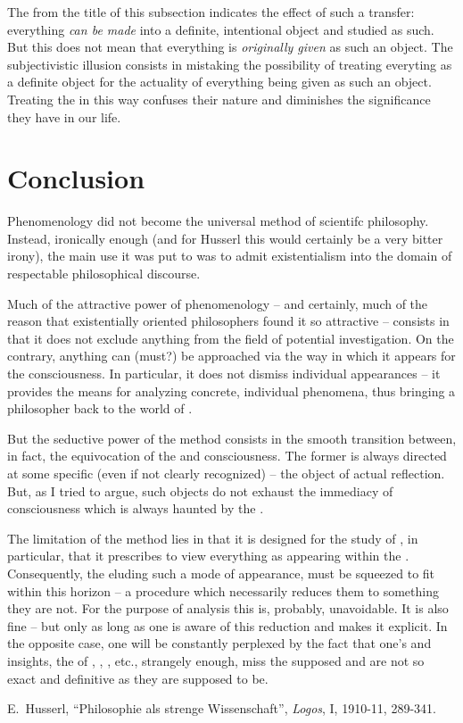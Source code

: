 The  from the title of this subsection 
indicates the effect of such a transfer: 
everything {\em can be made} into a definite, intentional object and 
studied as such. But this 
does not mean that everything is {\em originally given} as such an object.
The subjectivistic illusion consists in mistaking the possibility of 
treating everyting as a definite object for the actuality of everything being 
given as such an object.
Treating the  in this way confuses their nature 
and diminishes the significance they have in our life.

\section{Conclusion}
Phenomenology did not become the universal method of 
scientifc philosophy. Instead, ironically enough (and for Husserl this 
would certainly be a very bitter irony), the main use it was put to was to 
admit existentialism into the domain of respectable philosophical 
discourse. 

Much of the attractive power of phenomenology -- and certainly, much 
of the reason that existentially oriented philosophers found it so 
attractive -- consists in that it 
does not exclude anything from the field of potential investigation. 
On the contrary, anything can (must?) be approached via the way in which it 
appears for the consciousness. In particular, it does not dismiss individual
appearances -- it provides the means for analyzing concrete,
individual phenomena, thus bringing a philosopher back to the world of .

But the seductive power of the 
method consists in the smooth transition between, in fact, the equivocation 
of the  and  
consciousness. The former is always directed at some specific (even if 
not clearly recognized)  -- the object of actual 
reflection. But, as I tried to argue, such objects do not exhaust 
the immediacy of consciousness which is always haunted 
by the .

The limitation of the method lies in that it is designed for the 
study of , in particular, that it prescribes to view everything
as  appearing within the . 
Consequently, the  eluding such a mode of 
appearance, must be 
squeezed to fit within this horizon -- a procedure which necessarily
reduces them to something they are not. For the purpose of analysis this is, 
probably, unavoidable. It is also fine --
but only as long as one is aware of this reduction and makes it explicit.
In the opposite case, one will be constantly perplexed by the fact that
 one's 
and insights,  the  of , 
, , etc., strangely enough, %
miss the supposed  and are not so exact and definitive as 
they are supposed to be.

\begin{thebibliography}{SU}
 E.~Husserl, ``Philosophie als strenge Wissenschaft'', {\em Logos}, I, 
1910-11, 289-341. %
\end{thebibliography}


